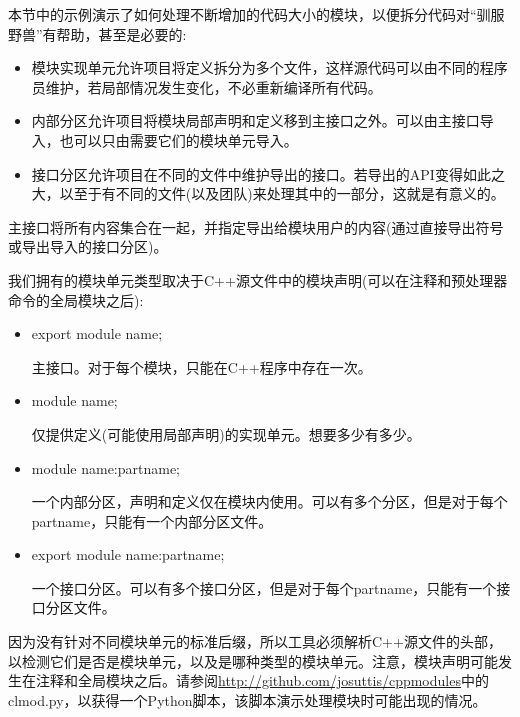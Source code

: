 本节中的示例演示了如何处理不断增加的代码大小的模块，以便拆分代码对“驯服野兽”有帮助，甚至是必要的:

\begin{itemize}
\item 
模块实现单元允许项目将定义拆分为多个文件，这样源代码可以由不同的程序员维护，若局部情况发生变化，不必重新编译所有代码。

\item 
内部分区允许项目将模块局部声明和定义移到主接口之外。可以由主接口导入，也可以只由需要它们的模块单元导入。

\item 
接口分区允许项目在不同的文件中维护导出的接口。若导出的API变得如此之大，以至于有不同的文件(以及团队)来处理其中的一部分，这就是有意义的。
\end{itemize}

主接口将所有内容集合在一起，并指定导出给模块用户的内容(通过直接导出符号或导出导入的接口分区)。

我们拥有的模块单元类型取决于C++源文件中的模块声明(可以在注释和预处理器命令的全局模块之后):

\begin{itemize}
\item 
export module name; 

主接口。对于每个模块，只能在C++程序中存在一次。

\item 
module name;

仅提供定义(可能使用局部声明)的实现单元。想要多少有多少。

\item 
module name:partname;

一个内部分区，声明和定义仅在模块内使用。可以有多个分区，但是对于每个partname，只能有一个内部分区文件。

\item 
export module name:partname; 

一个接口分区。可以有多个接口分区，但是对于每个partname，只能有一个接口分区文件。
\end{itemize}

因为没有针对不同模块单元的标准后缀，所以工具必须解析C++源文件的头部，以检测它们是否是模块单元，以及是哪种类型的模块单元。注意，模块声明可能发生在注释和全局模块之后。请参阅\url{http://github.com/josuttis/cppmodules}中的clmod.py，以获得一个Python脚本，该脚本演示处理模块时可能出现的情况。






